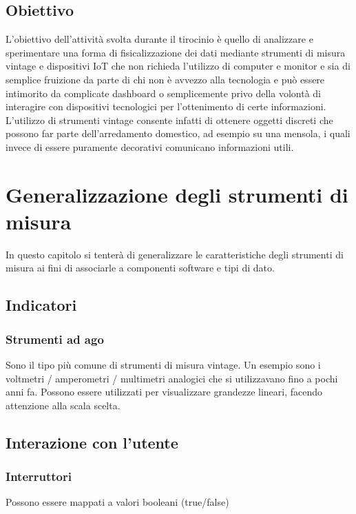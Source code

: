 \documentclass[12pt,a4paper]{report}
\begin{document}

\section{Obiettivo}
L'obiettivo dell'attività svolta durante il tirocinio è quello di analizzare e sperimentare una forma di fisicalizzazione
dei dati mediante strumenti di misura vintage e dispositivi IoT che non richieda l'utilizzo di computer e monitor e sia di semplice fruizione
da parte di chi non è avvezzo alla tecnologia e può essere intimorito da complicate dashboard o semplicemente privo della volontà
di interagire con dispositivi tecnologici per l'ottenimento di certe informazioni. L'utilizzo di strumenti vintage consente infatti di ottenere
oggetti discreti che possono far parte dell'arredamento domestico, ad esempio su una mensola, i quali invece di essere puramente
decorativi comunicano informazioni utili.



\chapter{Generalizzazione degli strumenti di misura}
In questo capitolo si tenterà di generalizzare le caratteristiche degli strumenti di misura ai fini di associarle a componenti software e tipi di dato.
\section{Indicatori}
\subsection{Strumenti ad ago}
Sono il tipo più comune di strumenti di misura vintage. Un esempio sono i voltmetri / amperometri / multimetri analogici che si utilizzavano
fino a pochi anni fa. Possono essere utilizzati per visualizzare grandezze lineari, facendo attenzione alla scala scelta.

\section{Interazione con l'utente}

\subsection{Interruttori}
Possono essere mappati a valori booleani (true/false)
\end{document}
